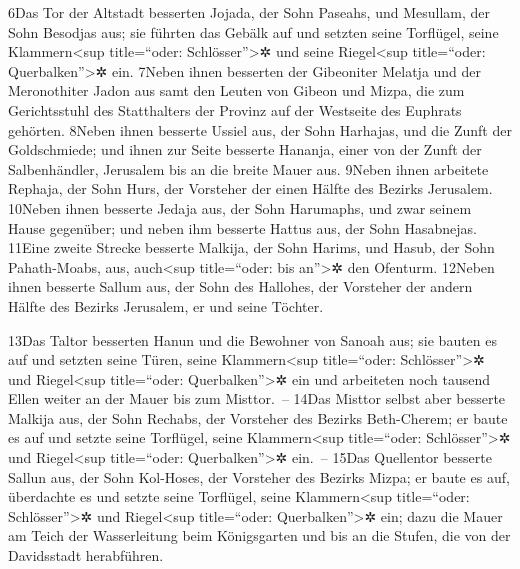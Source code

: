 6Das Tor der Altstadt besserten Jojada, der Sohn Paseahs, und Mesullam,
der Sohn Besodjas aus; sie führten das Gebälk auf und setzten seine
Torflügel, seine Klammern\textless sup title=``oder:
Schlösser''\textgreater✲ und seine Riegel\textless sup title=``oder:
Querbalken''\textgreater✲ ein. 7Neben ihnen besserten der Gibeoniter
Melatja und der Meronothiter Jadon aus samt den Leuten von Gibeon und
Mizpa, die zum Gerichtsstuhl des Statthalters der Provinz auf der
Westseite des Euphrats gehörten. 8Neben ihnen besserte Ussiel aus, der
Sohn Harhajas, und die Zunft der Goldschmiede; und ihnen zur Seite
besserte Hananja, einer von der Zunft der Salbenhändler, Jerusalem bis
an die breite Mauer aus. 9Neben ihnen arbeitete Rephaja, der Sohn Hurs,
der Vorsteher der einen Hälfte des Bezirks Jerusalem. 10Neben ihnen
besserte Jedaja aus, der Sohn Harumaphs, und zwar seinem Hause
gegenüber; und neben ihm besserte Hattus aus, der Sohn Hasabnejas.
11Eine zweite Strecke besserte Malkija, der Sohn Harims, und Hasub, der
Sohn Pahath-Moabs, aus, auch\textless sup title=``oder: bis
an''\textgreater✲ den Ofenturm. 12Neben ihnen besserte Sallum aus, der
Sohn des Hallohes, der Vorsteher der andern Hälfte des Bezirks
Jerusalem, er und seine Töchter.

13Das Taltor besserten Hanun und die Bewohner von Sanoah aus; sie bauten
es auf und setzten seine Türen, seine Klammern\textless sup
title=``oder: Schlösser''\textgreater✲ und Riegel\textless sup
title=``oder: Querbalken''\textgreater✲ ein und arbeiteten noch tausend
Ellen weiter an der Mauer bis zum Misttor.~-- 14Das Misttor selbst aber
besserte Malkija aus, der Sohn Rechabs, der Vorsteher des Bezirks
Beth-Cherem; er baute es auf und setzte seine Torflügel, seine
Klammern\textless sup title=``oder: Schlösser''\textgreater✲ und
Riegel\textless sup title=``oder: Querbalken''\textgreater✲ ein.~--
15Das Quellentor besserte Sallun aus, der Sohn Kol-Hoses, der Vorsteher
des Bezirks Mizpa; er baute es auf, überdachte es und setzte seine
Torflügel, seine Klammern\textless sup title=``oder:
Schlösser''\textgreater✲ und Riegel\textless sup title=``oder:
Querbalken''\textgreater✲ ein; dazu die Mauer am Teich der Wasserleitung
beim Königsgarten und bis an die Stufen, die von der Davidsstadt
herabführen.

